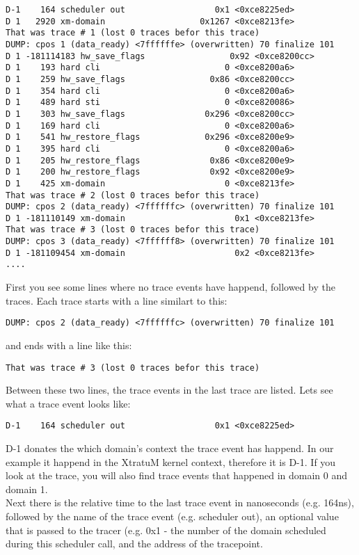 \begin{verbatim}
D-1    164 scheduler out                  0x1 <0xce8225ed>
D 1   2920 xm-domain                   0x1267 <0xce8213fe>
That was trace # 1 (lost 0 traces befor this trace)
DUMP: cpos 1 (data_ready) <7ffffffe> (overwritten) 70 finalize 101
D 1 -181114183 hw_save_flags                 0x92 <0xce8200cc>
D 1    193 hard cli                         0 <0xce8200a6>
D 1    259 hw_save_flags                 0x86 <0xce8200cc>
D 1    354 hard cli                         0 <0xce8200a6>
D 1    489 hard sti                         0 <0xce820086>
D 1    303 hw_save_flags                0x296 <0xce8200cc>
D 1    169 hard cli                         0 <0xce8200a6>
D 1    541 hw_restore_flags             0x296 <0xce8200e9>
D 1    395 hard cli                         0 <0xce8200a6>
D 1    205 hw_restore_flags              0x86 <0xce8200e9>
D 1    200 hw_restore_flags              0x92 <0xce8200e9>
D 1    425 xm-domain                        0 <0xce8213fe>
That was trace # 2 (lost 0 traces befor this trace)
DUMP: cpos 2 (data_ready) <7ffffffc> (overwritten) 70 finalize 101
D 1 -181110149 xm-domain                      0x1 <0xce8213fe>
That was trace # 3 (lost 0 traces befor this trace)
DUMP: cpos 3 (data_ready) <7ffffff8> (overwritten) 70 finalize 101
D 1 -181109454 xm-domain                      0x2 <0xce8213fe>
....
\end{verbatim}

First you see some lines where no trace events have happend, followed by the traces.
Each trace starts with a line similart to this:

\begin{verbatim}
DUMP: cpos 2 (data_ready) <7ffffffc> (overwritten) 70 finalize 101
\end{verbatim}

and ends with a line like this:

\begin{verbatim}
That was trace # 3 (lost 0 traces befor this trace)
\end{verbatim}

Between these two lines, the trace events in the last trace are listed. Lets
see what a trace event looks like:

\begin{verbatim}
D-1    164 scheduler out                  0x1 <0xce8225ed>
\end{verbatim}

D-1 donates the which domain's context the trace event has happend. In our example it happend in the XtratuM kernel context,
therefore it is D-1. If you look at the trace, you will also find trace events that happened in domain 0 and  domain 1. \\
Next there is the relative time to the last trace event in nanoseconds (e.g. 164ns), followed by the name of the
trace event (e.g. scheduler out), an optional value that is passed to the tracer (e.g. 0x1 - the number of the domain
scheduled during this scheduler call, and the address of the tracepoint.\\

